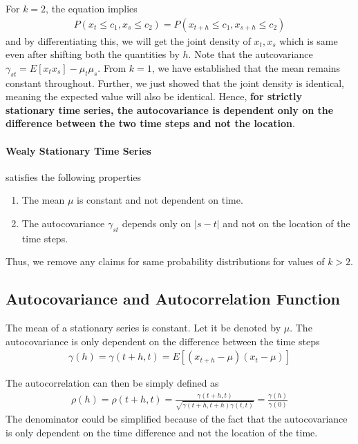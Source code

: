 \documentclass[../../time_series_notes.tex]{subfiles}
\begin{document}
For $k=2$, the equation implies
\begin{align*}
    P(x_{t} \leq c_{1}, x_{s} \leq c_{2}) = P(x_{t+h} \leq c_{1}, x_{s+h} \leq c_{2})
\end{align*}
and by differentiating this, we will get the joint density of $x_{t}, x_{s}$ which is same even after shifting both the quantities by $h$. Note that the autcovariance $\gamma_{st} = E[x_{t} x_{s}] - \mu_{t} \mu_{s}$. From $k=1$, we have established that the mean remains constant throughout. Further, we just showed that the joint density is identical, meaning the expected value will also be identical. Hence, \textbf{for strictly stationary time series, the autocovariance is dependent only on the difference between the two time steps and not the location}.\newline

\paragraph{Wealy Stationary Time Series} satisfies the following properties
\begin{enumerate}
    \item The mean $\mu$ is constant and not dependent on time.
    \item The autocovariance $\gamma_{st}$ depends only on $\lvert s - t \rvert$ and not on the location of the time steps.
\end{enumerate}
Thus, we remove any claims for same probability distributions for values of $k > 2$.\newline

\subsection{Autocovariance and Autocorrelation Function}
The mean of a stationary series is constant. Let it be denoted by $\mu$.\newline
The autocovariance is only dependent on the difference between the time steps
\begin{align*}
    \gamma (h) = \gamma(t+h,t) = E[(x_{t+h} - \mu)(x_{t} - \mu)]
\end{align*}

The autocorrelation can then be simply defined as
\begin{align*}
    \rho (h) = \rho(t+h, t) = \frac{\gamma (t+h,t)}{\sqrt{\gamma(t+h, t+h) \gamma(t, t)}} = \frac{\gamma(h)}{\gamma(0)}
\end{align*}
The denominator could be simplified because of the fact that the autocovariance is only dependent on the time difference and not the location of the time.\newline
\end{document}
